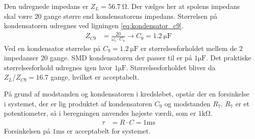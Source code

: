 Den udregnede impedans er $Z_L = \SI{56.7}{\ohm}$.
Der vælges her at spolens impedans skal være 20 gange større end kondensatorens impedans. Størrelsen på kondensatoren udregnes ved ligningen \ref{eq:kondensator_c9}.
\begin{align}
	Z_{C9} & = \frac{20}{\omega_c \cdot C_9} \rightarrow C_9 = \SI{1.2}{\micro\farad} \label{eq:kondensator_c9}
\end{align}
Ved en kondensator størrelse på $C_9 = \SI{1.2}{\micro\farad}$ er størrelsesforholdet mellem de 2 impedanser 20 gange. 
SMD kondensatoren der passer til er på $ 1\si{\micro\farad}$. Det praktiske størrelsesforhold udregnes igen hvor $ 1\si{\micro\farad}$. Størrelsesforholdet bliver da $\si{Z_L \per Z_{C9}} = \num{16.7}$ gange, hvilket er acceptabelt.

På grund af modstanden og kondensatoren i kredsløbet, opstår der en forsinkelse i systemet, der er lig produktet af kondensatoren $C_9$ og modstanden $R_7$. $R_7$ er et potentiometer, så i beregningen anvendes højeste værdi, som er $1\si{\kilo\ohm}$.
\begin{align}
	\tau & = R \cdot C = 1 \si{\milli\second}
\end{align}
Forsinkelsen på $1 \si{\milli\second}$ er acceptabelt for systemet.

